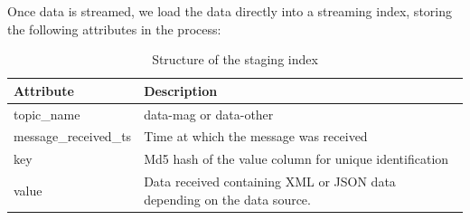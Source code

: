 \documentclass[10pt,journal,final,a4paper]{IEEEtran}
\begin{document}
Once data is streamed, we load the data directly into a streaming index, storing the following attributes in the process:

\begin{table}[ht]
\centering
\tiny
\begin{tabular}{ll}
\hline
Attribute              & Description                                                             \\ \hline
topic\_name            & data-mag or data-other                                                  \\ \hline
message\_received\_ts & Time at which the message was received                                  \\ \hline
key                    & Md5 hash of the value column for unique identification                  \\ \hline
value                  & Data received containing XML or JSON data depending on the data source. \\ \hline
\end{tabular}
\caption{Structure of the staging index}
\end{table}
\end{document}
